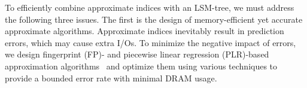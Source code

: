 To efficiently combine approximate indices with an LSM-tree, we
must address the following three issues.  
The first is the design of memory-efficient yet accurate approximate algorithms.
Approximate indices inevitably result in prediction errors, which may cause extra I/Os.
To minimize the negative impact of errors,
we design fingerprint (FP)- and piecewise linear regression (PLR)-based
approximation algorithms~\cite{plr1,plr2, plr3} and
optimize them using various techniques 
to provide a bounded error rate with minimal DRAM usage.

